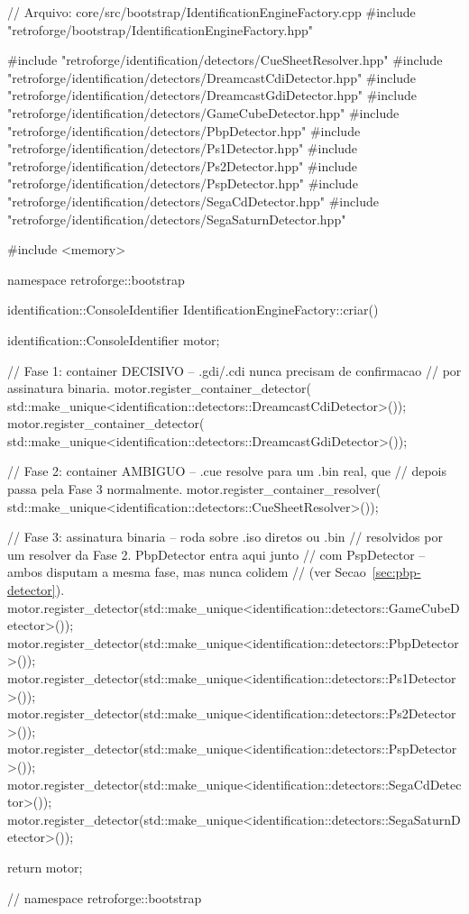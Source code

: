 \begin{CaixaCodigo}
// Arquivo: core/src/bootstrap/IdentificationEngineFactory.cpp
#include "retroforge/bootstrap/IdentificationEngineFactory.hpp"

#include "retroforge/identification/detectors/CueSheetResolver.hpp"
#include "retroforge/identification/detectors/DreamcastCdiDetector.hpp"
#include "retroforge/identification/detectors/DreamcastGdiDetector.hpp"
#include "retroforge/identification/detectors/GameCubeDetector.hpp"
#include "retroforge/identification/detectors/PbpDetector.hpp"
#include "retroforge/identification/detectors/Ps1Detector.hpp"
#include "retroforge/identification/detectors/Ps2Detector.hpp"
#include "retroforge/identification/detectors/PspDetector.hpp"
#include "retroforge/identification/detectors/SegaCdDetector.hpp"
#include "retroforge/identification/detectors/SegaSaturnDetector.hpp"

#include <memory>

namespace retroforge::bootstrap {

identification::ConsoleIdentifier IdentificationEngineFactory::criar() {
    identification::ConsoleIdentifier motor;

    // Fase 1: container DECISIVO -- .gdi/.cdi nunca precisam de confirmacao
    // por assinatura binaria.
    motor.register_container_detector(
        std::make_unique<identification::detectors::DreamcastCdiDetector>());
    motor.register_container_detector(
        std::make_unique<identification::detectors::DreamcastGdiDetector>());

    // Fase 2: container AMBIGUO -- .cue resolve para um .bin real, que
    // depois passa pela Fase 3 normalmente.
    motor.register_container_resolver(
        std::make_unique<identification::detectors::CueSheetResolver>());

    // Fase 3: assinatura binaria -- roda sobre .iso diretos ou .bin
    // resolvidos por um resolver da Fase 2. PbpDetector entra aqui junto
    // com PspDetector -- ambos disputam a mesma fase, mas nunca colidem
    // (ver Secao~\ref{sec:pbp-detector}).
    motor.register_detector(std::make_unique<identification::detectors::GameCubeDetector>());
    motor.register_detector(std::make_unique<identification::detectors::PbpDetector>());
    motor.register_detector(std::make_unique<identification::detectors::Ps1Detector>());
    motor.register_detector(std::make_unique<identification::detectors::Ps2Detector>());
    motor.register_detector(std::make_unique<identification::detectors::PspDetector>());
    motor.register_detector(std::make_unique<identification::detectors::SegaCdDetector>());
    motor.register_detector(std::make_unique<identification::detectors::SegaSaturnDetector>());

    return motor;
}

} // namespace retroforge::bootstrap
\end{CaixaCodigo}

